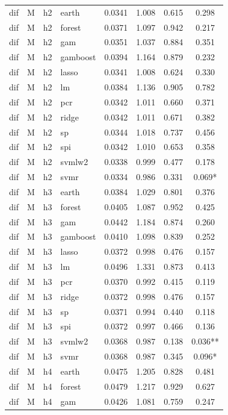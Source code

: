 \begin{ThreePartTable}
\begin{longtable}[t]{llclcccc}
\addlinespace
dif & M & h2 & earth & 0.0341 & 1.008 & 0.615 & 0.298\\
dif & M & h2 & forest & 0.0371 & 1.097 & 0.942 & 0.217\\
dif & M & h2 & gam & 0.0351 & 1.037 & 0.884 & 0.351\\
dif & M & h2 & gamboost & 0.0394 & 1.164 & 0.879 & 0.232\\
dif & M & h2 & lasso & 0.0341 & 1.008 & 0.624 & 0.330\\
dif & M & h2 & lm & 0.0384 & 1.136 & 0.905 & 0.782\\
dif & M & h2 & pcr & 0.0342 & 1.011 & 0.660 & 0.371\\
dif & M & h2 & ridge & 0.0342 & 1.011 & 0.671 & 0.382\\
dif & M & h2 & sp & 0.0344 & 1.018 & 0.737 & 0.456\\
dif & M & h2 & spi & 0.0342 & 1.010 & 0.653 & 0.358\\
dif & M & h2 & svmlw2 & 0.0338 & 0.999 & 0.477 & 0.178\\
dif & M & h2 & svmr & 0.0334 & 0.986 & 0.331 & 0.069*\\
\addlinespace
dif & M & h3 & earth & 0.0384 & 1.029 & 0.801 & 0.376\\
dif & M & h3 & forest & 0.0405 & 1.087 & 0.952 & 0.425\\
dif & M & h3 & gam & 0.0442 & 1.184 & 0.874 & 0.260\\
dif & M & h3 & gamboost & 0.0410 & 1.098 & 0.839 & 0.252\\
dif & M & h3 & lasso & 0.0372 & 0.998 & 0.476 & 0.157\\
dif & M & h3 & lm & 0.0496 & 1.331 & 0.873 & 0.413\\
dif & M & h3 & pcr & 0.0370 & 0.992 & 0.415 & 0.119\\
dif & M & h3 & ridge & 0.0372 & 0.998 & 0.476 & 0.157\\
dif & M & h3 & sp & 0.0371 & 0.994 & 0.440 & 0.118\\
dif & M & h3 & spi & 0.0372 & 0.997 & 0.466 & 0.136\\
dif & M & h3 & svmlw2 & 0.0368 & 0.987 & 0.138 & 0.036**\\
dif & M & h3 & svmr & 0.0368 & 0.987 & 0.345 & 0.096*\\
\addlinespace
dif & M & h4 & earth & 0.0475 & 1.205 & 0.828 & 0.481\\
dif & M & h4 & forest & 0.0479 & 1.217 & 0.929 & 0.627\\
dif & M & h4 & gam & 0.0426 & 1.081 & 0.759 & 0.247\\

\end{longtable}
\end{ThreePartTable}
